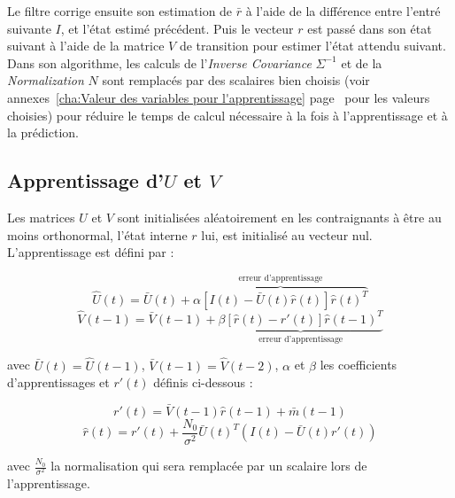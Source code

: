 Le filtre corrige ensuite son estimation de $\bar{r}$ à l'aide de la
différence entre l'entré suivante $I$, et l'état estimé précédent. Puis le
vecteur $r$ est passé dans son état suivant à l'aide de la matrice $V$ de
transition pour estimer l'état attendu suivant.\\

Dans son algorithme, les calculs de l'\textit{Inverse Covariance} $\Sigma^{-1}$
et de la \textit{Normalization} $N$ sont remplacés par des scalaires bien
choisis (voir annexes~\ref{cha:Valeur des variables pour l'apprentissage}
page~\pageref{cha:Valeur des variables pour l'apprentissage} pour les valeurs
choisies) pour réduire le temps de calcul nécessaire à la fois à
l'apprentissage et à la prédiction.


\subsection{Apprentissage d'$U$ et $V$} %
\label{sub:Apprentissage de U et V}

Les matrices $U$ et $V$ sont initialisées aléatoirement en les contraignants
à être au moins orthonormal, l'état interne $r$ lui, est initialisé au vecteur
nul. L'apprentissage est défini par :

\begin{equation}
   \label{eqn:learning_U}
   \hat{U}(t) = \bar{U}(t) + \overbrace{\alpha[I(t) - \bar{U}(t)\hat{r}(t)]\hat{r}(t)^T}^\text{erreur d'apprentissage}
\end{equation}
\begin{equation}
   \label{eqn:learning_V}
   \hat{V}(t-1) = \bar{V}(t-1) + \underbrace{\beta[\hat{r}(t) - r'(t)]\hat{r}(t-1)^T}_\text{erreur d'apprentissage}
\end{equation}

avec $\bar{U}(t) = \hat{U}(t-1)$, $\bar{V}(t-1) = \hat{V}(t-2)$, $\alpha$ et
$\beta$ les coefficients d'apprentissages et $r'(t)$ définis ci-dessous :

\begin{equation}
   \label{eqn:def_r_prime}
   r'(t) =  \bar{V}(t-1)\hat{r}(t-1) + \bar{m}(t-1)
\end{equation}
\begin{equation}
   \label{eqn:def_r_hat}
   \hat{r}(t) = r'(t) + \frac{N_0}{\sigma^2}\bar{U}(t)^T(I(t)-\bar{U}(t)r'(t))
\end{equation}

avec $\frac{N_0}{\sigma^2}$ la normalisation qui sera remplacée par un scalaire lors
de l'apprentissage.

